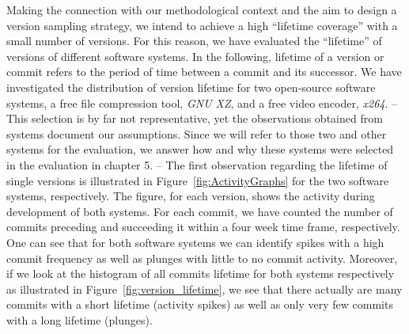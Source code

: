 Making the connection with our methodological context and the aim to design a
version sampling strategy, we intend to achieve a high “lifetime coverage” with
a small number of versions. For this reason, we have evaluated the “lifetime”
of versions of different software systems. In the following, lifetime of a
version or commit refers to the period of time between a commit and its
successor. We have investigated the distribution of version lifetime for two
open-source software systems, a free file compression tool, \emph{GNU XZ}, and a
free video encoder, \emph{x264}. – This selection is by far not representative, yet
the observations obtained from systems document our assumptions. Since we will
refer to those two and other systems for the evaluation, we answer how and why
these systems were selected in the evaluation in chapter 5.  – The first
observation regarding the lifetime of single versions is illustrated in
Figure~\ref{fig:ActivityGraphs} for the two software systems, respectively. The
figure, for each version, shows the activity during development of both systems.
For each commit, we have counted the number of commits preceding and succeeding
it within a four week time frame, respectively. One can see that for both
software systems we can identify spikes with a high commit frequency as well as
plunges with little to no commit activity. Moreover, if we look at the
histogram of all commits lifetime for both systems respectively as illustrated
in Figure~\ref{fig:version_lifetime}, we see that there actually are many
commits with a short lifetime (activity spikes) as well as only very few commits with a long lifetime (plunges).

